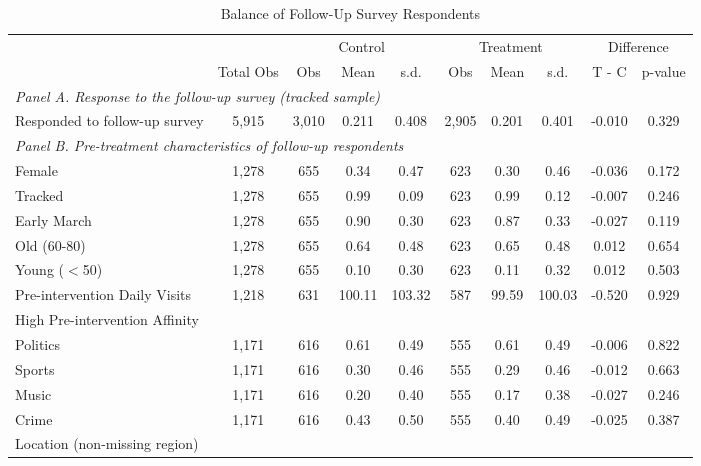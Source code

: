 \begin{table}[H]
\centering
\caption{Balance of Follow-Up Survey Respondents}
\label{tab:balance_followup}
\begin{adjustbox}{max width=\textwidth}
\begin{tabular}{lccccccccc}
\toprule
 & & \multicolumn{3}{c}{Control} & \multicolumn{3}{c}{Treatment} & \multicolumn{2}{c}{Difference} \\
\cmidrule(lr){3-5} \cmidrule(lr){6-8} \cmidrule(lr){9-10}
 & Total Obs & Obs & Mean & s.d. & Obs & Mean & s.d. & T - C & p-value \\
\midrule
\multicolumn{10}{l}{\it Panel A. Response to the follow-up survey (tracked sample)} \\
Responded to follow-up survey & 5,915 & 3,010 & 0.211 & 0.408 & 2,905 & 0.201 & 0.401 & -0.010 & 0.329 \\
\midrule
\multicolumn{10}{l}{\it Panel B. Pre-treatment characteristics of follow-up respondents} \\
Female & 1,278 & 655 & 0.34 & 0.47 & 623 & 0.30 & 0.46 & -0.036 & 0.172 \\
Tracked & 1,278 & 655 & 0.99 & 0.09 & 623 & 0.99 & 0.12 & -0.007 & 0.246 \\
Early March & 1,278 & 655 & 0.90 & 0.30 & 623 & 0.87 & 0.33 & -0.027 & 0.119 \\
Old (60-80) & 1,278 & 655 & 0.64 & 0.48 & 623 & 0.65 & 0.48 & 0.012 & 0.654 \\
Young ($<$50) & 1,278 & 655 & 0.10 & 0.30 & 623 & 0.11 & 0.32 & 0.012 & 0.503 \\
Pre-intervention Daily Visits & 1,218 & 631 & 100.11 & 103.32 & 587 & 99.59 & 100.03 & -0.520 & 0.929 \\
High Pre-intervention Affinity & & & & & & & & & \\
\hspace{2mm} Politics & 1,171 & 616 & 0.61 & 0.49 & 555 & 0.61 & 0.49 & -0.006 & 0.822 \\
\hspace{2mm} Sports & 1,171 & 616 & 0.30 & 0.46 & 555 & 0.29 & 0.46 & -0.012 & 0.663 \\
\hspace{2mm} Music & 1,171 & 616 & 0.20 & 0.40 & 555 & 0.17 & 0.38 & -0.027 & 0.246 \\
\hspace{2mm} Crime & 1,171 & 616 & 0.43 & 0.50 & 555 & 0.40 & 0.49 & -0.025 & 0.387 \\
Location (non-missing region) & & & & & & & & & \\

\end{tabular}
\end{adjustbox}
\end{table}
